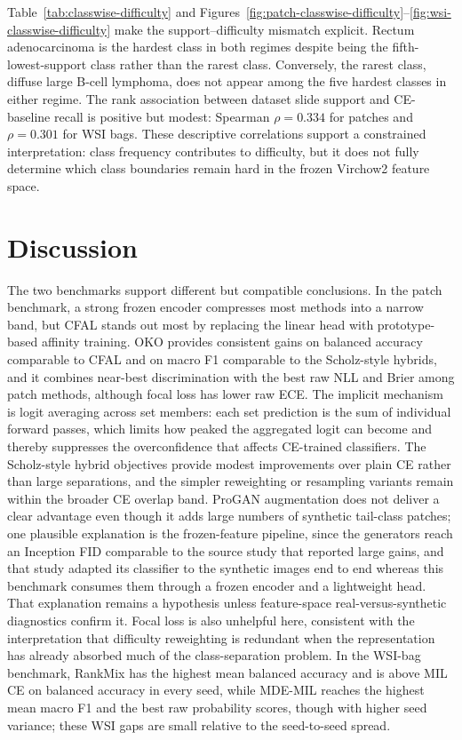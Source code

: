 \documentclass[11pt]{article}
\begin{document}
Table~\ref{tab:classwise-difficulty} and Figures~\ref{fig:patch-classwise-difficulty}--\ref{fig:wsi-classwise-difficulty} make the support--difficulty mismatch explicit. Rectum adenocarcinoma is the hardest class in both regimes despite being the fifth-lowest-support class rather than the rarest class. Conversely, the rarest class, diffuse large B-cell lymphoma, does not appear among the five hardest classes in either regime. The rank association between dataset slide support and CE-baseline recall is positive but modest: Spearman $\rho=\num{0.334}$ for patches and $\rho=\num{0.301}$ for WSI bags. These descriptive correlations support a constrained interpretation: class frequency contributes to difficulty, but it does not fully determine which class boundaries remain hard in the frozen Virchow2 feature space.

\section{Discussion}
The two benchmarks support different but compatible conclusions. In the patch benchmark, a strong frozen encoder compresses most methods into a narrow band, but CFAL stands out most by replacing the linear head with prototype-based affinity training. OKO provides consistent gains on balanced accuracy comparable to CFAL and on macro F1 comparable to the Scholz-style hybrids, and it combines near-best discrimination with the best raw NLL and Brier among patch methods, although focal loss has lower raw ECE. The implicit mechanism is logit averaging across set members: each set prediction is the sum of individual forward passes, which limits how peaked the aggregated logit can become and thereby suppresses the overconfidence that affects CE-trained classifiers. The Scholz-style hybrid objectives provide modest improvements over plain CE rather than large separations, and the simpler reweighting or resampling variants remain within the broader CE overlap band. ProGAN augmentation does not deliver a clear advantage even though it adds large numbers of synthetic tail-class patches; one plausible explanation is the frozen-feature pipeline, since the generators reach an Inception FID comparable to the source study that reported large gains, and that study adapted its classifier to the synthetic images end to end whereas this benchmark consumes them through a frozen encoder and a lightweight head. That explanation remains a hypothesis unless feature-space real-versus-synthetic diagnostics confirm it. Focal loss is also unhelpful here, consistent with the interpretation that difficulty reweighting is redundant when the representation has already absorbed much of the class-separation problem. In the WSI-bag benchmark, RankMix has the highest mean balanced accuracy and is above MIL CE on balanced accuracy in every seed, while MDE-MIL reaches the highest mean macro F1 and the best raw probability scores, though with higher seed variance; these WSI gaps are small relative to the seed-to-seed spread.
\end{document}
